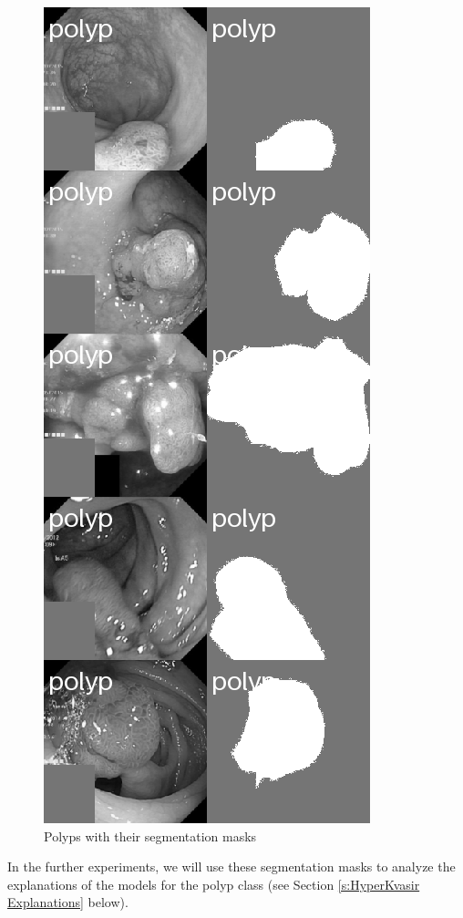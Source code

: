\documentclass[en]{pracamgr}
\begin{document}
\begin{figure}[H]
\centering
\includegraphics[scale=0.5]{./images/polyps_segmentation.png}
\caption{Polyps with their segmentation masks}
\label{polyps_segmentation}
\end{figure}

In the further experiments, we will use these segmentation masks to analyze the explanations of the models for the polyp class (see Section \ref{s:HyperKvasir Explanations} below).
\end{document}

